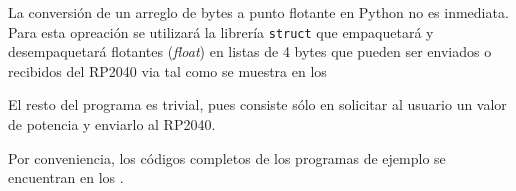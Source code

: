 La conversión de un arreglo de bytes a punto flotante en Python no es inmediata.
Para esta opreación se utilizará la librería \texttt{struct} que empaquetará y desempaquetará flotantes (\emph{float}) en listas de 4 bytes que pueden ser enviados o recibidos del RP2040 via \IIC tal como se muestra en los 




El resto del programa es trivial, pues consiste sólo en solicitar al usuario un valor de potencia y enviarlo al RP2040.

Por conveniencia, los códigos completos de los programas de ejemplo se encuentran en los .
